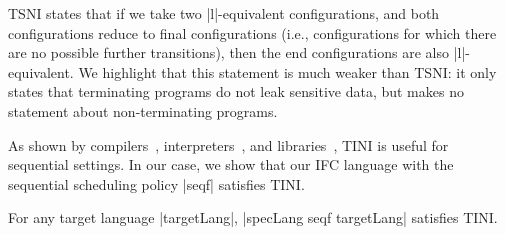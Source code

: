 TSNI states that if we take two |l|-equivalent configurations, and both
configurations reduce to final configurations (i.e.,
configurations for which there are no
possible further transitions), then the end configurations are also
|l|-equivalent.
%
We highlight that this statement is much weaker than TSNI: it only states that
terminating programs do not leak sensitive data, but makes no statement
about non-terminating programs.

As shown by compilers~\cite{jif,FlowCaml}, interpreters~\cite{JSFlow}, and
libraries~\cite{Russo+:Haskell08,lio}, TINI is useful for sequential
settings. In our case, we show that our IFC language with the sequential scheduling policy
|seqf| satisfies TINI.
%
\begin{theorem}
  \label{thm:seq-tini}
For any target language |targetLang|, |specLang seqf targetLang| satisfies TINI.
\end{theorem}



